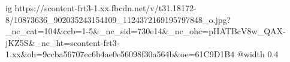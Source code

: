  
 
 
 
 

\ifcmt
  ig https://scontent-frt3-1.xx.fbcdn.net/v/t31.18172-8/10873636_902035243154109_1124372169195797848_o.jpg?_nc_cat=104&ccb=1-5&_nc_sid=730e14&_nc_ohc=pHATBcV8w_QAX-jKZ5S&_nc_ht=scontent-frt3-1.xx&oh=9ccba56707ec6b4ae0e56098f30a564b&oe=61C9D1B4
  @width 0.4
\fi
